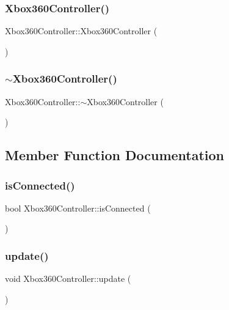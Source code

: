 \subsubsection{\texorpdfstring{Xbox360Controller()}{Xbox360Controller()}}
{\footnotesize\ttfamily Xbox360\+Controller\+::\+Xbox360\+Controller (\begin{DoxyParamCaption}{ }\end{DoxyParamCaption})}

\mbox{\label{class_xbox360_controller_a4b8fa4e05500c5831eeb434ac54459ce}} 
\subsubsection{\texorpdfstring{$\sim$Xbox360Controller()}{~Xbox360Controller()}}
{\footnotesize\ttfamily Xbox360\+Controller\+::$\sim$\+Xbox360\+Controller (\begin{DoxyParamCaption}{ }\end{DoxyParamCaption})}



\subsection{Member Function Documentation}
\mbox{\label{class_xbox360_controller_afc98be4195611706fcb57b942d38de1c}} 
\subsubsection{\texorpdfstring{isConnected()}{isConnected()}}
{\footnotesize\ttfamily bool Xbox360\+Controller\+::is\+Connected (\begin{DoxyParamCaption}{ }\end{DoxyParamCaption})}

\mbox{\label{class_xbox360_controller_aac924e1c636c81c81f2a19c4a2b62a03}} 
\subsubsection{\texorpdfstring{update()}{update()}}
{\footnotesize\ttfamily void Xbox360\+Controller\+::update (\begin{DoxyParamCaption}{ }\end{DoxyParamCaption})}



